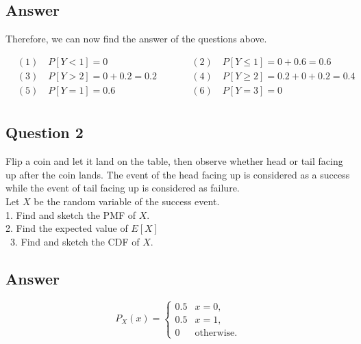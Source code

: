 \documentclass[12pt]{report} %
\begin{document}
\subsection*{Answer}

\noindent Therefore, we can now find the answer of the questions above.

\begin{align*}
    &(1) \quad P[Y < 1] = 0 \quad\quad &&(2) \quad P[Y \leq 1] = 0 + 0.6 = 0.6 \\
    &(3) \quad P[Y > 2]  = 0 + 0.2 = 0.2 \quad\quad &&(4) \quad P[Y \geq 2] = 0.2 + 0 + 0.2 = 0.4 \\
    &(5) \quad P[Y = 1] = 0.6 \quad\quad &&(6) \quad P[Y = 3] = 0 \\
\end{align*}

\newpage

\subsection*{Question 2}

\noindent Flip a coin and let it land on the table, then observe
whether head or tail facing up after the coin lands. The event of the
head facing up is considered as a success while the event of tail
facing up is considered as failure. \\

\noindent Let $X$ be the random variable of the success event. \\
1. Find and sketch the PMF of $X$. \\
2. Find the expected value of $E[X]$ \\\
3. Find and sketch the CDF of $X$. \\

\subsection*{Answer}

\begin{multicols}{2}
\[
P_X(x) =
\begin{cases}
0.5 & x = 0, \\
0.5 & x = 1, \\
0 & \text{otherwise}.
\end{cases}
\]
\columnbreak
\\
\begin{center}
\end{center}
\end{multicols}
\end{document}
